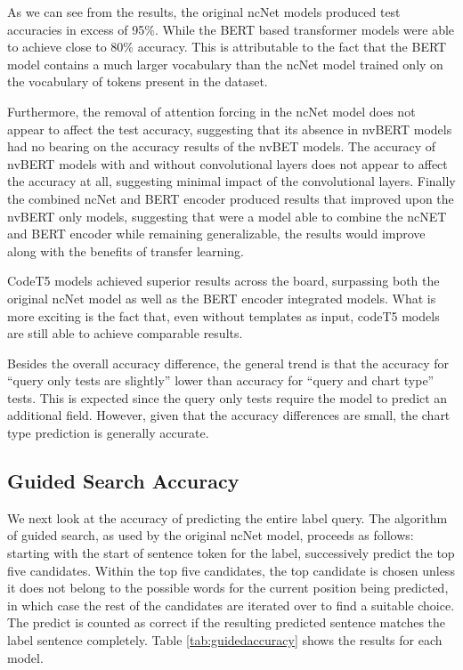 \documentclass[
	a4paper, %
	10pt, %
	unnumberedsections, %
	twoside, %
]{t0003}
\begin{document}
As we can see from the results, the original ncNet models produced test accuracies in excess of 95\%. While the BERT based transformer models were able to achieve close to 80\% accuracy. This is attributable to the fact that the BERT model contains a much larger vocabulary than the ncNet model trained only on the vocabulary of tokens present in the dataset.

Furthermore, the removal of attention forcing in the ncNet model does not appear to affect the test accuracy, suggesting that its absence in nvBERT models had no bearing on the accuracy results of the nvBET models. The accuracy of nvBERT models with and without convolutional layers does not appear to affect the accuracy at all, suggesting minimal impact of the convolutional layers.
Finally the combined ncNet and BERT encoder produced results that improved upon the nvBERT only models, suggesting that were a model able to combine the ncNET and BERT encoder while remaining generalizable, the results would improve along with the benefits of transfer learning.

CodeT5 models achieved superior results across the board, surpassing both the original ncNet model as well as the BERT encoder integrated models. What is more exciting is the fact that, even without templates as input, codeT5 models are still able to achieve comparable results.

Besides the overall accuracy difference, the general trend is that the accuracy for ``query only tests are slightly'' lower than accuracy for ``query and chart type'' tests. This is expected since the query only tests require the model to predict an additional field. However, given that the accuracy differences are small, the chart type prediction is generally accurate.

\subsection{Guided Search Accuracy}

We next look at the accuracy of predicting the entire label query. The algorithm of guided search, as used by the original ncNet model, proceeds as follows: starting with the start of sentence token for the label, successively predict the top five candidates. Within the top five candidates, the top candidate is chosen unless it does not belong to the possible words for the current position being predicted, in which case the rest of the candidates are iterated over to find a suitable choice. The predict is counted as correct if the resulting predicted sentence matches the label sentence completely. Table \ref{tab:guidedaccuracy} shows the results for each model.
\end{document}
